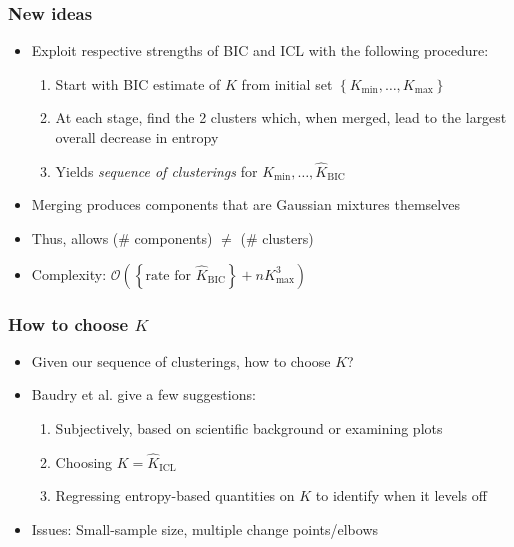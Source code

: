 \documentclass[mathserif,compress]{beamer}
\newcommand*\set[1]{\left\{#1\right\}}
\newcommand*\estim[1]{\widehat{#1}}
\renewcommand\;{\,}
\begin{document}
\begin{frame}\frametitle{New ideas}
\begin{itemize}
\item[]
Exploit respective strengths of BIC and ICL with the following procedure:
\begin{enumerate}
\medskip
\item
Start with BIC estimate of $K$ from initial set $\set{K_\text{min}, \dotsc, K_\text{max}}$
\medskip
\item
At each stage, find the 2 clusters which, when merged, lead to the largest overall decrease in entropy
\medskip
\item
Yields \emph{sequence of clusterings} for $K_\text{min}, \dotsc, \estim K_\text{BIC}$
\end{enumerate} 
\bigskip
\item[]
Merging produces components that are Gaussian mixtures themselves
\bigskip
\item[]
Thus, allows (\# components) $\ne$ (\# clusters)
\bigskip
\item[]
Complexity: $\mathcal O \left( \left\{\text{rate for } \estim K_\text{BIC} \right\}+ n K_\text{max}^3 \right)$
\end{itemize}
\end{frame}

\begin{frame}\frametitle{How to choose $K$}
\begin{itemize}
\item[]
Given our sequence of clusterings, how to choose $K$?
\bigskip
\item[]
Baudry et al. give a few suggestions:
\begin{enumerate}
\medskip
\item
Subjectively, based on scientific background or examining plots
\bigskip
\item
Choosing $K = \estim K_\text{ICL}$
\bigskip
\item
Regressing entropy-based quantities on $K$ to identify when it levels off
\end{enumerate}
\bigskip
\item[]
Issues: Small-sample size, multiple change points/elbows
\end{itemize}
\end{frame}
\end{document}
